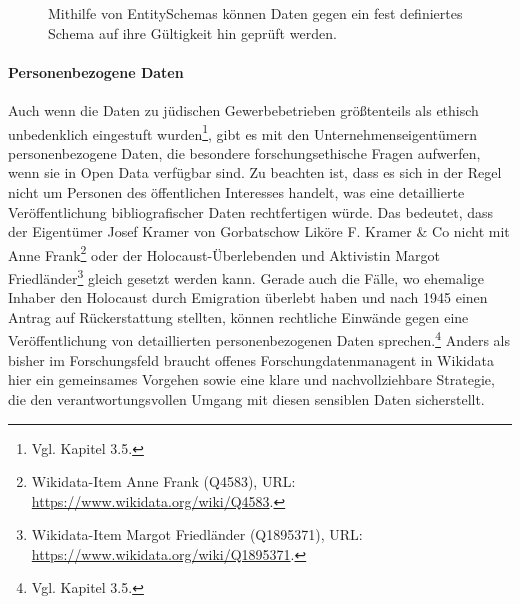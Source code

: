 \begin{figure}[h]
    \centering
    \caption{Mithilfe von EntitySchemas können Daten gegen ein fest definiertes Schema auf ihre Gültigkeit hin geprüft werden.}
    \label{fig:wikidataentityschema}
\end{figure}

\paragraph{Personenbezogene Daten}

Auch wenn die Daten zu jüdischen Gewerbebetrieben größtenteils als ethisch unbedenklich eingestuft wurden\footnote{Vgl. Kapitel 3.5.}, gibt es mit den Unternehmenseigentümern personenbezogene Daten, die besondere forschungsethische Fragen aufwerfen, wenn sie in Open Data verfügbar sind. Zu beachten ist, dass es sich in der Regel nicht um Personen des öffentlichen Interesses handelt, was eine detaillierte Veröffentlichung bibliografischer Daten rechtfertigen würde. Das bedeutet, dass der Eigentümer Josef Kramer von Gorbatschow Liköre F. Kramer \& Co nicht mit Anne Frank\footnote{Wikidata-Item Anne Frank (Q4583), URL: \url{https://www.wikidata.org/wiki/Q4583}.} oder der Holocaust-Überlebenden und Aktivistin Margot Friedländer\footnote{Wikidata-Item Margot Friedländer (Q1895371), URL: \url{https://www.wikidata.org/wiki/Q1895371}.} gleich gesetzt werden kann. Gerade auch die Fälle, wo ehemalige Inhaber den Holocaust durch Emigration überlebt haben und nach 1945 einen Antrag auf Rückerstattung stellten, können rechtliche Einwände gegen eine Veröffentlichung von detaillierten personenbezogenen Daten sprechen.\footnote{Vgl. Kapitel 3.5.} Anders als bisher im Forschungsfeld braucht offenes Forschungdatenmanagent in Wikidata hier ein gemeinsames Vorgehen sowie eine klare und nachvollziehbare Strategie, die den verantwortungsvollen Umgang mit diesen sensiblen Daten sicherstellt. 

